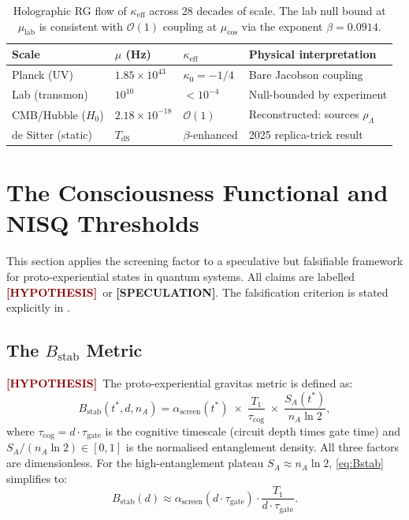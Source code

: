 \documentclass[12pt,a4paper]{article}
\newcommand{\HYP}{\textcolor{darkred}{\textbf{[HYPOTHESIS]}}}
\newcommand{\SPEC}{\textcolor{darkpurple}{\textbf{[SPECULATION]}}}
\theoremstyle{monette}
\theoremstyle{definition}
\newcommand{\SA}{S_A}
\newcommand{\asc}{\alpha_{\mathrm{screen}}}
\newcommand{\Bstab}{B_{\mathrm{stab}}}
\newcommand{\tgate}{\tau_{\mathrm{gate}}}
\newcommand{\tcog}{\tau_{\mathrm{cog}}}
\newcommand{\Tone}{T_1}
\newcommand{\mulab}{\mu_{\mathrm{lab}}}
\newcommand{\mucos}{\mu_{\mathrm{cos}}}
\begin{document}
\begin{table}[h!]
\centering
\caption{Holographic RG flow of $\kappa_{\mathrm{eff}}$ across 28 decades of scale.
The lab null bound at $\mulab$ is consistent with $\mathcal{O}(1)$ coupling at $\mucos$
via the exponent $\beta = 0.0914$.}
\label{tab:RG}
\begin{tabular}{lllp{5.5cm}}
\toprule
\textbf{Scale} & $\mu$ (Hz) & $\kappa_{\mathrm{eff}}$ & \textbf{Physical interpretation} \\
\midrule
Planck (UV)        & $1.85\times 10^{43}$ & $\kappa_0 = -1/4$     & Bare Jacobson coupling \\
Lab (transmon)     & $10^{10}$            & $< 10^{-4}$           & Null-bounded by experiment \\
CMB/Hubble ($H_0$) & $2.18\times 10^{-18}$& $\mathcal{O}(1)$      & Reconstructed: sources $\rho_\Lambda$ \\
de Sitter (static) & $T_{\mathrm{dS}}$    & $\beta$-enhanced      & 2025 replica-trick result \\
\bottomrule
\end{tabular}
\end{table}

\section{The Consciousness Functional and NISQ Thresholds}
\label{sec:consciousness}

\begin{notebox}
This section applies the screening factor to a speculative but falsifiable
framework for proto-experiential states in quantum systems.
All claims are labelled \HYP\ or \SPEC.
The falsification criterion is stated explicitly in .
\end{notebox}

\subsection{The \texorpdfstring{$B_{\mathrm{stab}}$}{B\_stab} Metric}
\label{sec:Bstab}

\HYP\ The proto-experiential gravitas metric is defined as:
\begin{equation}
  \Bstab(t^*, d, n_A) = \asc(t^*)\;\times\;\frac{\Tone}{\tcog}\;\times\;
    \frac{\SA(t^*)}{n_A\ln 2},
  \label{eq:Bstab}
\end{equation}
where $\tcog = d\cdot\tgate$ is the cognitive timescale (circuit depth times
gate time) and $\SA/(n_A\ln 2) \in [0,1]$ is the normalised entanglement density.
All three factors are dimensionless. For the high-entanglement plateau
$\SA \approx n_A\ln 2$, \cref{eq:Bstab} simplifies to:
\begin{equation}
  \Bstab(d) \approx \asc(d\cdot\tgate)\cdot\frac{\Tone}{d\cdot\tgate}.
  \label{eq:Bstab_approx}
\end{equation}
\end{document}
